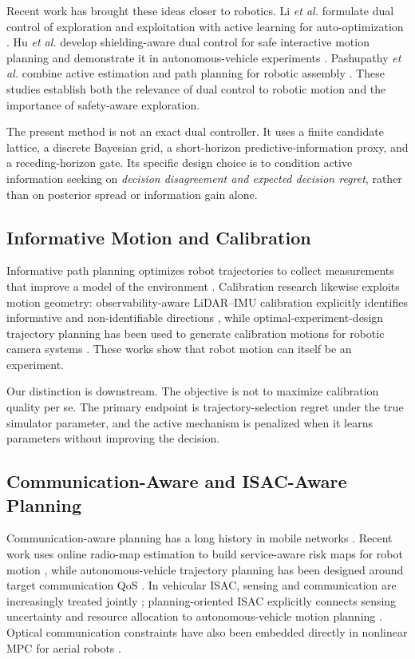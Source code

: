 \documentclass[journal]{IEEEtran}
\begin{document}
Recent work has brought these ideas closer to robotics. Li \emph{et al.} formulate dual control of exploration and exploitation with active learning for auto-optimization \cite{li2025}. Hu \emph{et al.} develop shielding-aware dual control for safe interactive motion planning and demonstrate it in autonomous-vehicle experiments \cite{hu2024}. Pashupathy \emph{et al.} combine active estimation and path planning for robotic assembly \cite{pashupathy2026}. These studies establish both the relevance of dual control to robotic motion and the importance of safety-aware exploration.

The present method is not an exact dual controller. It uses a finite candidate lattice, a discrete Bayesian grid, a short-horizon predictive-information proxy, and a receding-horizon gate. Its specific design choice is to condition active information seeking on \emph{decision disagreement and expected decision regret}, rather than on posterior spread or information gain alone.

\subsection{Informative Motion and Calibration}
Informative path planning optimizes robot trajectories to collect measurements that improve a model of the environment \cite{hitz2017,popovic2020}. Calibration research likewise exploits motion geometry: observability-aware LiDAR--IMU calibration explicitly identifies informative and non-identifiable directions \cite{lv2022}, while optimal-experiment-design trajectory planning has been used to generate calibration motions for robotic camera systems \cite{amersdorfer2025}. These works show that robot motion can itself be an experiment.

Our distinction is downstream. The objective is not to maximize calibration quality per se. The primary endpoint is trajectory-selection regret under the true simulator parameter, and the active mechanism is penalized when it learns parameters without improving the decision.

\subsection{Communication-Aware and ISAC-Aware Planning}
Communication-aware planning has a long history in mobile networks \cite{ghaffarkhah2011}. Recent work uses online radio-map estimation to build service-aware risk maps for robot motion \cite{gordon2026}, while autonomous-vehicle trajectory planning has been designed around target communication QoS \cite{ullah2025}. In vehicular ISAC, sensing and communication are increasingly treated jointly \cite{cheng2022}; planning-oriented ISAC explicitly connects sensing uncertainty and resource allocation to autonomous-vehicle motion planning \cite{jin2026}. Optical communication constraints have also been embedded directly in nonlinear MPC for aerial robots \cite{silano2025}.
\end{document}
